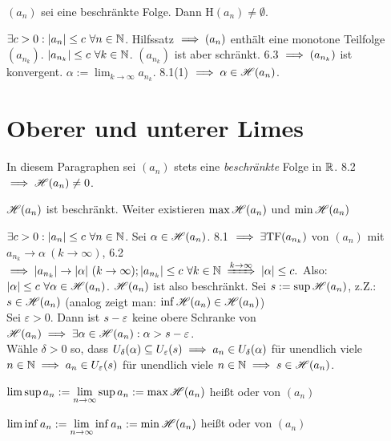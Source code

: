 \documentclass[a4paper,twoside,DIV15,BCOR12mm]{scrbook}
\begin{document}
\begin{satz}
$(a_n)$ sei eine beschränkte Folge. Dann H$(a_n) \ne \emptyset$.
\end{satz}

\begin{beweis}
$\exists c>0: |a_n| \le c \ \forall n\in\mathbb{N}$. Hilfssatz $\implies (a_n)$ enthält eine monotone Teilfolge $(a_{n_k})$. $|a_{n_k}| \le c \ \forall k \in\mathbb{N}$. $(a_{n_k})$ ist aber schränkt. 6.3 $\implies (a_{n_k})$ ist konvergent. $\alpha := \lim_{k\to\infty}a_{n_k}$. 8.1(1) $\implies \alpha \in \mathscr{H}(a_n)$. 
\end{beweis}

\chapter{Oberer und unterer Limes}

\begin{vereinbarung}
In diesem Paragraphen sei $(a_n)$ stets eine \textit{beschränkte} Folge in $\mathbb{R}$. 8.2 $\implies \mathscr{H}(a_n) \ne 0$.
\end{vereinbarung}

\begin{satz}
$\mathscr{H}(a_n)$ ist beschränkt. Weiter existieren $\max \mathscr{H}(a_n)$ und $\min \mathscr{H}(a_n)$
\end{satz}
\begin{beweis}
$\exists c>0: |a_n| \le c \ \forall n\in\mathbb{N}$. Sei $\alpha \in \mathscr{H}(a_n)$. 8.1 $\implies \exists \text{TF}(a_{n_k})$ von $(a_n)$ mit $a_{n_k} \to \alpha\ (k\to\infty)$, 6.2 $\folgt |a_{n_k}| \to |\alpha| \ (k\to\infty); |a_{n_k}| \le c \ \forall k \in\MdN \folgtwegen{k\to\infty} |\alpha| \le c.$
Also: $|\alpha| \le c  \ \forall \alpha \in \mathscr{H}(a_n)$. $\mathscr{H}(a_n)$ ist also beschränkt. Sei $s:=\sup\mathscr{H}(a_n)$, z.Z.: $s\in\mathscr{H}(a_n)$ (analog zeigt man: $\inf\mathscr{H}(a_n) \in \mathscr{H}(a_n)$) \\
Sei $\varepsilon > 0$. Dann ist $s-\varepsilon$ keine obere Schranke von $\mathscr{H}(a_n) \implies \exists \alpha \in \mathscr{H}(a_n): \alpha > s - \varepsilon$.\\
Wähle $\delta > 0$ so, dass $U_\delta(\alpha) \subseteq U_\varepsilon(s) \implies a_n \in U_\delta(\alpha)$ für unendlich viele $n\in\mathbb{N} \implies a_n\in U_\varepsilon(s)$ für unendlich viele $n\in\mathbb{N} \implies s \in \mathscr{H}(a_n)$.
\end{beweis}

\begin{definition}
$\displaystyle\limsup a_n := \lim_{n\to\infty}\sup a_n := \max\mathscr{H}(a_n)$ heißt  oder  von $(a_n)$

$\displaystyle\liminf a_n := \lim_{n\to\infty}\inf a_n := \min\mathscr{H}(a_n)$ heißt  oder  von $(a_n)$
\end{definition}
\end{document}
